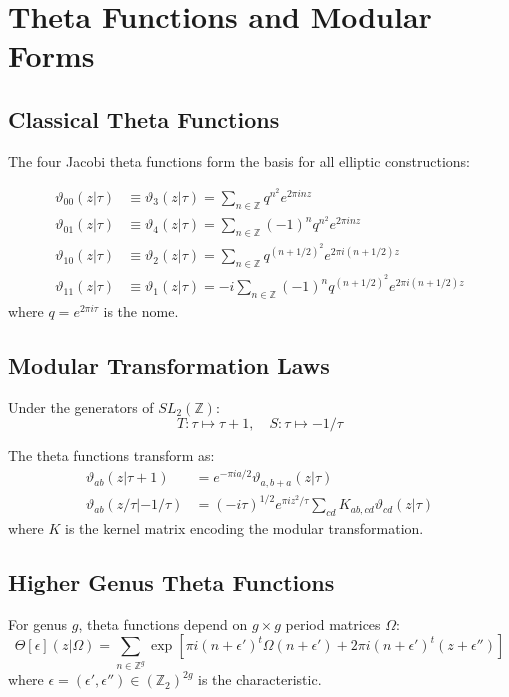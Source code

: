 \section{Theta Functions and Modular Forms}

\subsection{Classical Theta Functions}

The four Jacobi theta functions form the basis for all elliptic constructions:

\begin{definition}
\begin{align}
\vartheta_{00}(z|\tau) &\equiv \vartheta_3(z|\tau) = \sum_{n \in \mathbb{Z}} q^{n^2} e^{2\pi inz} \\
\vartheta_{01}(z|\tau) &\equiv \vartheta_4(z|\tau) = \sum_{n \in \mathbb{Z}}(-1)^n q^{n^2} e^{2\pi inz} \\
\vartheta_{10}(z|\tau) &\equiv \vartheta_2(z|\tau) = \sum_{n \in \mathbb{Z}} q^{(n+1/2)^2} e^{2\pi i(n+1/2)z} \\
\vartheta_{11}(z|\tau) &\equiv \vartheta_1(z|\tau) = -i\sum_{n \in \mathbb{Z}}(-1)^n q^{(n+1/2)^2} e^{2\pi i(n+1/2)z}
\end{align}
where $q = e^{2\pi i\tau}$ is the nome.
\end{definition}

\subsection{Modular Transformation Laws}

Under the generators of $SL_2(\mathbb{Z})$:
$$T: \tau \mapsto \tau + 1, \quad S: \tau \mapsto -1/\tau$$

The theta functions transform as:
\begin{align}
\vartheta_{ab}(z|\tau+1) &= e^{-\pi ia/2} \vartheta_{a,b+a}(z|\tau) \\
\vartheta_{ab}(z/\tau|-1/\tau) &= (-i\tau)^{1/2} e^{\pi iz^2/\tau} \sum_{cd} K_{ab,cd} \vartheta_{cd}(z|\tau)
\end{align}
where $K$ is the kernel matrix encoding the modular transformation.

\subsection{Higher Genus Theta Functions}

For genus $g$, theta functions depend on $g \times g$ period matrices $\Omega$:
$$\Theta[\epsilon](z|\Omega) = \sum_{n \in \mathbb{Z}^g} \exp\left[\pi i(n+\epsilon')^t\Omega(n+\epsilon') + 2\pi i(n+\epsilon')^t(z+\epsilon'')\right]$$
where $\epsilon = (\epsilon', \epsilon'') \in (\mathbb{Z}_2)^{2g}$ is the characteristic.


